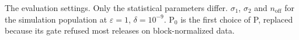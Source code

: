 \caption{The evaluation settings. Only the statistical parameters differ. $\sigma_1$, $\sigma_2$ and $n_{\mathrm{off}}$ for the simulation population at $\varepsilon = 1$, $\delta = 10^{-9}$. P$_0$ is the first choice of P, replaced because its gate refused most releases on block-normalized data.}
\label{tab:settings}
\setlength{\tabcolsep}{4pt}

